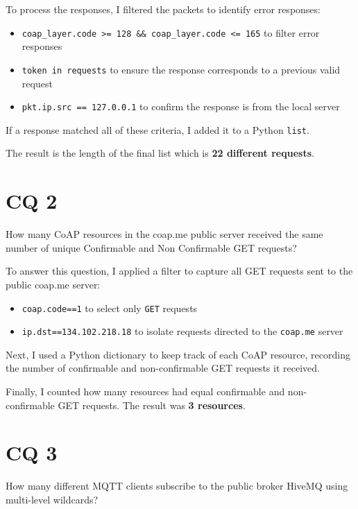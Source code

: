 \documentclass{Configuration_Files/PoliMi3i_thesis}
\begin{document}
To process the responses, I filtered the packets to identify error responses:
\begin{itemize}
  \item \texttt{coap\_layer.code >= 128 \&\& coap\_layer.code <= 165} to filter error responses
  \item \texttt{token in requests} to ensure the response corresponds to a previous valid request
  \item \texttt{pkt.ip.src == 127.0.0.1} to confirm the response is from the local server
\end{itemize}

If a response matched all of these criteria, I added it to a Python \texttt{list}.

The result is the length of the final list which is \textbf{22 different requests}.



\chapter{CQ 2}
\begin{tcolorbox}[questionbox]
    How many CoAP resources in the coap.me public server received the same number of unique Confirmable and Non Confirmable GET requests?
\end{tcolorbox}

To answer this question, I applied a filter to capture all GET requests sent to the public coap.me server:

\begin{itemize}
  \item \texttt{coap.code==1} to select only \texttt{GET} requests
  \item \texttt{ip.dst==134.102.218.18} to isolate requests directed to the \texttt{coap.me} server
\end{itemize}

Next, I used a Python dictionary to keep track of each CoAP resource, recording the number of confirmable and non-confirmable GET requests it received.

Finally, I counted how many resources had equal confirmable and non-confirmable GET requests.  
The result was \textbf{3 resources}.



\chapter{CQ 3}
\begin{tcolorbox}[questionbox]
    How many different MQTT clients subscribe to the public broker HiveMQ using multi-level wildcards?
\end{tcolorbox}
\end{document}
